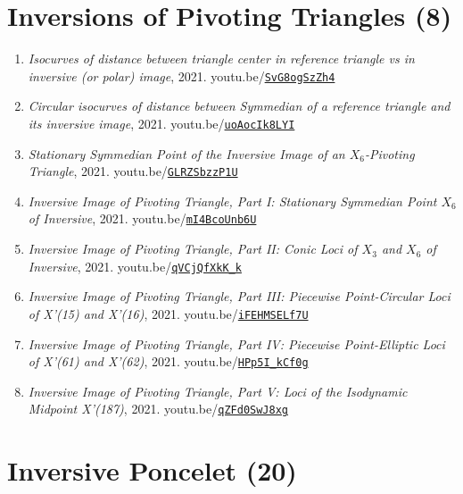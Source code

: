 \documentclass[12pt]{article}
\begin{document}
\section{Inversions of Pivoting Triangles (8)}

\begin{enumerate}[resume]
\item \textit{Isocurves of distance between triangle center in reference triangle vs in inversive (or polar) image}, 2021. youtu.be/\href{https://youtu.be/SvG8ogSzZh4}{\nolinkurl{SvG8ogSzZh4}}
\item \textit{Circular isocurves of distance between Symmedian of a reference triangle and its inversive image}, 2021. youtu.be/\href{https://youtu.be/uoAocIk8LYI}{\nolinkurl{uoAocIk8LYI}}
\item \textit{Stationary Symmedian Point of the Inversive Image of an $X_{6}$-Pivoting Triangle}, 2021. youtu.be/\href{https://youtu.be/GLRZSbzzP1U}{\nolinkurl{GLRZSbzzP1U}}
\item \textit{Inversive Image of Pivoting Triangle, Part I: Stationary Symmedian Point $X_{6}$ of Inversive}, 2021. youtu.be/\href{https://youtu.be/mI4BcoUnb6U}{\nolinkurl{mI4BcoUnb6U}}
\item \textit{Inversive Image of Pivoting Triangle, Part II: Conic Loci of $X_{3}$ and $X_{6}$ of Inversive}, 2021. youtu.be/\href{https://youtu.be/qVCjQfXkK_k}{\nolinkurl{qVCjQfXkK\_k}}
\item \textit{Inversive Image of Pivoting Triangle, Part III: Piecewise Point-Circular Loci of X'(15) and X'(16)}, 2021. youtu.be/\href{https://youtu.be/iFEHMSELf7U}{\nolinkurl{iFEHMSELf7U}}
\item \textit{Inversive Image of Pivoting Triangle, Part IV: Piecewise Point-Elliptic Loci of X'(61) and X'(62)}, 2021. youtu.be/\href{https://youtu.be/HPp5I_kCf0g}{\nolinkurl{HPp5I\_kCf0g}}
\item \textit{Inversive Image of Pivoting Triangle, Part V: Loci of the Isodynamic Midpoint X'(187)}, 2021. youtu.be/\href{https://youtu.be/qZFd0SwJ8xg}{\nolinkurl{qZFd0SwJ8xg}}
\end{enumerate}

\section{Inversive Poncelet (20)}
\end{document}
